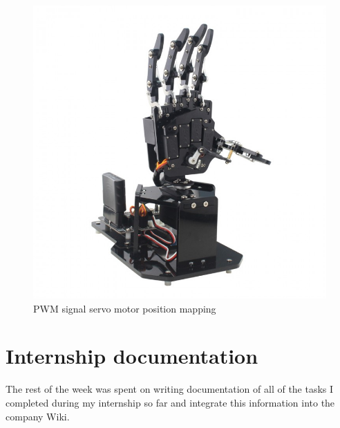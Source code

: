 \begin{figure}[!htb]
	\centering
		\includegraphics[width=\textwidth]{bilder/robohand.jpg}
		\caption{\acs{PWM} signal servo motor position mapping}
		\label{fig:pwm_servo}
\end{figure}
\section{Internship documentation}
The rest of the week was spent on writing documentation of all of the tasks I completed during my internship so far and integrate this information into the company Wiki.